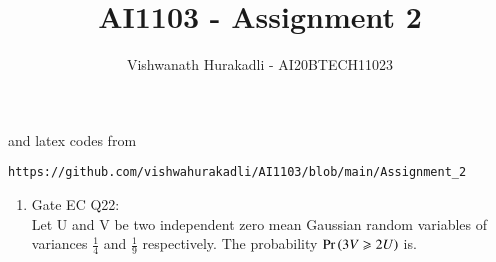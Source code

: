 \documentclass[journal,12pt,twocolumn]{IEEEtran}
\begin{document}
     \def\centbox#1{\makebox[0in]{#1}}
     \def\topbox#1{\raisebox{-\baselineskip}[0in][0in]{#1}}
     \def\midbox#1{\raisebox{-0.5\baselineskip}[0in][0in]{#1}}
\vspace{3cm}
\title{AI1103 - Assignment 2}
\author{Vishwanath Hurakadli - AI20BTECH11023}
\maketitle
\newpage
\bigskip
\renewcommand{\thefigure}{\theenumi}
\renewcommand{\thetable}{\theenumi}
%
and latex codes from 
%
\begin{lstlisting}
https://github.com/vishwahurakadli/AI1103/blob/main/Assignment_2
\end{lstlisting}
\begin{enumerate}
\item Gate EC Q22:\\
Let U and V be two independent zero mean Gaussian random variables of variances \(\frac{1}{4}\) and \(\frac{1}{9}\) respectively. The probability \(\Pr\left(3V\geqslant2U\right)\) is.
\begin{enumerate}[]
\begin{multicols}{4}
\setlength\itemsep{0.1em}


\end{multicols}
\end{enumerate}
\end{enumerate}
\end{document}

